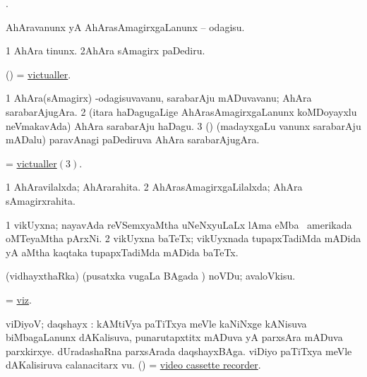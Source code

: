 \bentry
{} 
\gl{\kirx}
. 
\emng

\noindent
\gl{\sakirx}
\bmng
AhAravanunx yA AhArasAmagirxgaLanunx -- odagisu. 
\emng

\noindent 
\gl{\akirx}
\expl{}
\bmng
\bnum
\num{1} AhAra tinunx. 
\num{2}AhAra sAmagirx paDediru. 
\enum
\emng
\eentry

\bentry
{} 
\gl{\nA}
\expl{}
\bmng
 (\ame) = \hyperlink{victualler}{victualler}. 
\emng
\eentry

\bentry
{} 
\gl{\nA}
\expl{}
\bmng
\bnum
\num{1} AhAra(sAmagirx) -odagisuvavanu, sarabarAju mADuvavanu; AhAra sarabarAjugAra. 
\num{2} (itara haDagugaLige AhArasAmagirxgaLanunx koMDoyayxlu neVmakavAda) AhAra sarabarAju haDagu. 
\hypertarget{victualler(3)}{} 
\num{3} (\birx) (madayxgaLu \mo vanunx sarabarAju mADalu) paravAnagi paDediruva AhAra sarabarAjugAra. 
\enum
\emng

\noindent 
\gl{\pagu}
\expl{}
\bmng
  = \hyperlink{victualler(3)}{victualler\((3)\)}. 
\emng
\eentry

\bentry
{}
\gl{\gu}
\bmng
\bnum
\num{1} AhAravilalxda; AhArarahita. 
\num{2} AhArasAmagirxgaLilalxda; AhAra sAmagirxrahita. 
\enum
\emng
\eentry

\bentry
{} 
\gl{\nA}
\bmng
\bnum
\num{1} vikUyxna; nayavAda reVSemxyaMtha uNeNxyuLaLx lAma eMba \da\ amerikada oMTeyaMtha pArxNi.  
\num{2} vikUyxna baTeTx; vikUyxnada tupapxTadiMda mADida yA aMtha kaqtaka tupapxTadiMda mADida baTeTx. 
\enum
\emng
\eentry

\bentry 
{} 
\gl{\sakirx}
\expl{\Latin }
\bmng
 (vidhayxthaRka) (pusatxka \mo vugaLa BAgada \vi) noVDu; avaloVkisu. 
\emng
\eentry

\bentry
{} 
\gl{\kirxvi}
\expl{}
\bmng
 = \hyperlink{viz}{viz}. 
\emng
\eentry

\bentry
{} 
\gl{\nA}
\bmng
 viDiyoV; daqshayx : 
\banum
{} kAMtiVya paTiTxya meVle kaNiNxge kANisuva biMbagaLanunx dAKalisuva, punarutapxtitx mADuva yA parxsAra mADuva parxkirxye. 
 dUradashaRna parxsArada daqshayxBAga. 
 viDiyo paTiTxya meVle dAKalisiruva calanacitarx \mo vu. 
 (\AmA) = \hyperlink{video cassette recorder}{video cassette recorder}. 
\eanum
\emng
\eentry

